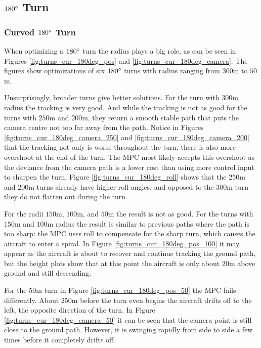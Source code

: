 \subsection{$180\degree$ Turn}
\subsubsection{Curved $180\degree$ Turn}

When optimizing a $180\degree$ turn the radius plays a big role, as can be seen in Figures \ref{fig:turns_cur_180deg_pos} and \ref{fig:turns_cur_180deg_camera}. The figures show optimizations of six $180\degree$ turns with radius ranging from $300$m to $50$m.

Unsurprisingly, broader turns give better solutions. For the turn with $300$m radius the tracking is very good. And while the tracking is not as good for the turns with $250$m and $200$m, they return a smooth stable path that puts the camera centre not too far away from the path. Notice in Figures \ref{fig:turns_cur_180deg_camera_250} and \ref{fig:turns_cur_180deg_camera_200} that the tracking not only is worse throughout the turn, there is also more overshoot at the end of the turn. The MPC most likely accepts this overshoot as the deviance from the camera path is a lower cost than using more control input to sharpen the turn. Figure \ref{fig:turns_cur_180deg_roll} shows that the $250$m and $200$m turns already have higher roll angles, and opposed to the $300$m turn they do not flatten out during the turn.

For the radii $150$m, $100$m, and $50$m the result is not as good. For the turns with $150$m and $100$m radius the result is similar to previous paths where the path is too sharp: the MPC uses roll to compensate for the sharp turn, which causes the aircraft to enter a spiral. In Figure \ref{fig:turns_cur_180deg_pos_100} it may appear as the aircraft is about to recover and continue tracking the ground path, but the height plots show that at this point the aircraft is only about $20$m above ground and still descending.

For the $50$m turn in Figure \ref{fig:turns_cur_180deg_pos_50} the MPC fails differently. About $250$m before the turn even begins the aircraft drifts off to the left, the opposite direction of the turn. In Figure \ref{fig:turns_cur_180deg_camera_50} it can be seen that the camera point is still close to the ground path. However, it is swinging rapidly from side to side a few times before it completely drifts off.

